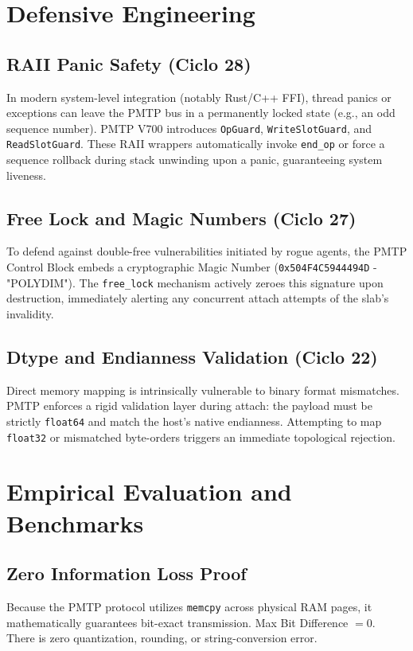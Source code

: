 \section{Defensive Engineering}

\subsection{RAII Panic Safety (Ciclo 28)}
In modern system-level integration (notably Rust/C++ FFI), thread panics or exceptions can leave the PMTP bus in a permanently locked state (e.g., an odd sequence number). PMTP V700 introduces \texttt{OpGuard}, \texttt{WriteSlotGuard}, and \texttt{ReadSlotGuard}. These RAII wrappers automatically invoke \texttt{end\_op} or force a sequence rollback during stack unwinding upon a panic, guaranteeing system liveness.

\subsection{Free Lock and Magic Numbers (Ciclo 27)}
To defend against double-free vulnerabilities initiated by rogue agents, the PMTP Control Block embeds a cryptographic Magic Number (\texttt{0x504F4C5944494D} - "POLYDIM"). The \texttt{free\_lock} mechanism actively zeroes this signature upon destruction, immediately alerting any concurrent attach attempts of the slab's invalidity.

\subsection{Dtype and Endianness Validation (Ciclo 22)}
Direct memory mapping is intrinsically vulnerable to binary format mismatches. PMTP enforces a rigid validation layer during attach: the payload must be strictly \texttt{float64} and match the host's native endianness. Attempting to map \texttt{float32} or mismatched byte-orders triggers an immediate topological rejection.

\section{Empirical Evaluation and Benchmarks}

\subsection{Zero Information Loss Proof}
Because the PMTP protocol utilizes \texttt{memcpy} across physical RAM pages, it mathematically guarantees bit-exact transmission. Max Bit Difference $= 0$. There is zero quantization, rounding, or string-conversion error.

